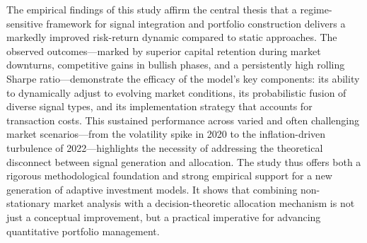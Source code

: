 \documentclass{singlecol-new}
\theoremstyle{TH}{
\newtheorem{lemma}{Lemma}
\newtheorem{theorem}[lemma]{Theorem}
\newtheorem{corrolary}[lemma]{Corrolary}
\newtheorem{conjecture}[lemma]{Conjecture}
\newtheorem{proposition}[lemma]{Proposition}
\newtheorem{claim}[lemma]{Claim}
\newtheorem{stheorem}[lemma]{Wrong Theorem}
\newtheorem{algorithm}{Algorithm}
}
\theoremstyle{THrm}{
\newtheorem{definition}{Definition}[section]
\newtheorem{question}{Question}[section]
\newtheorem{remark}{Remark}
\newtheorem{scheme}{Scheme}
}
\theoremstyle{THhit}{
\newtheorem{case}{Case}[section]
}
\begin{document}
The empirical findings of this study affirm the central thesis that a regime-sensitive framework for signal integration and portfolio construction delivers a markedly improved risk-return dynamic compared to static approaches. The observed outcomes—marked by superior capital retention during market downturns, competitive gains in bullish phases, and a persistently high rolling Sharpe ratio—demonstrate the efficacy of the model’s key components: its ability to dynamically adjust to evolving market conditions, its probabilistic fusion of diverse signal types, and its implementation strategy that accounts for transaction costs.
This sustained performance across varied and often challenging market scenarios—from the volatility spike in 2020 to the inflation-driven turbulence of 2022—highlights the necessity of addressing the theoretical disconnect between signal generation and allocation. The study thus offers both a rigorous methodological foundation and strong empirical support for a new generation of adaptive investment models. It shows that combining non-stationary market analysis with a decision-theoretic allocation mechanism is not just a conceptual improvement, but a practical imperative for advancing quantitative portfolio management.




%
%
%
\end{document}
